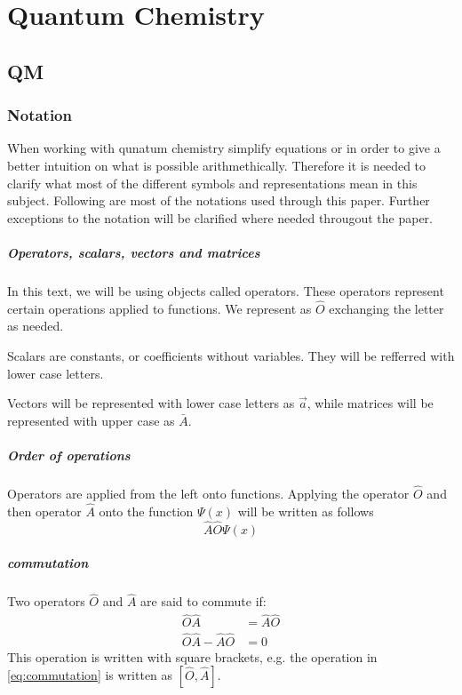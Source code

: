 \documentclass[../master_thesis.tex]{subfiles}
\begin{document}
\chapter{Quantum Chemistry}
\section{\ac{QM}}
\subsection{Notation}
When working with qunatum chemistry simplify equations or in order to give a
better intuition on what is possible arithmethically. Therefore it is needed to
clarify what most of the different symbols and representations mean in this
subject. Following are most of the notations used through this paper. Further exceptions to the notation will be
clarified where needed througout the paper.
\paragraph{Operators, scalars, vectors and matrices}
In this text, we will be using objects called operators. These operators represent
certain operations applied to functions. We represent as $\hat{O}$ exchanging the letter
as needed.

Scalars are constants, or coefficients without variables. They will be refferred with
lower case letters.

Vectors will be represented with lower case letters as $\vec{a}$, while
matrices will be represented with upper case as $\bar{A}$.
\paragraph{Order of operations}
Operators are applied from the left onto functions. Applying the operator
$\hat{O}$ and then operator $\hat{A}$ onto the function $\Psi(x)$ will be written as follows
\begin{equation}
  \hat{A}\hat{O}\Psi(x)
\end{equation}

\paragraph{commutation}
Two operators $\hat{O}$ and $\hat{A}$ are said to commute if:
\begin{align}
  \hat{O}\hat{A} &= \hat{A}\hat{O} \\
  \hat{O}\hat{A} - \hat{A}\hat{O} &= 0\label{eq:commutation}
\end{align}
This operation is written with square brackets, e.g. the operation in \ref{eq:commutation} is
written as $[\hat{O},\hat{A}]$.
\end{document}
